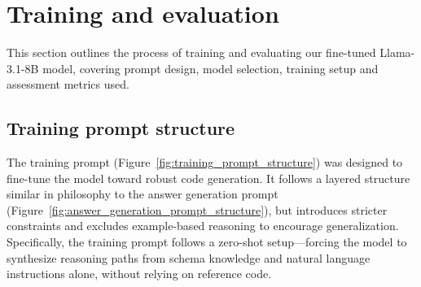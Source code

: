 





\section{Training and evaluation}

This section outlines the process of training and evaluating our fine-tuned Llama-3.1-8B model, covering prompt design, model selection, training setup and assessment metrics used.


\subsection{Training prompt structure}

The training prompt (Figure~\ref{fig:training_prompt_structure}) was designed to fine-tune the model toward robust code generation. It follows a layered structure similar in philosophy to the answer generation prompt (Figure~\ref{fig:answer_generation_prompt_structure}), but introduces stricter constraints and excludes example-based reasoning to encourage generalization. Specifically, the training prompt follows a zero-shot setup—forcing the model to synthesize reasoning paths from schema knowledge and natural language instructions alone, without relying on reference code.

